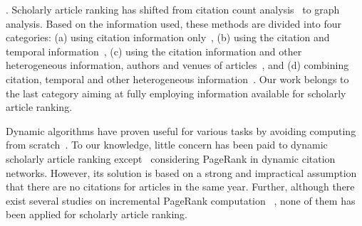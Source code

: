 . %
%
%
Scholarly article ranking has shifted from citation count analysis~\cite{Garfield471,Hirsch15112005} to graph analysis\cite{ChenXMR07,Zhou07-CoRank,Jiang12-MRank,Liang16AAAI,Li08TSRanking,Wang13AAAI,WalkerXKM07,sayyadi09,
Wang16TIST,Ng11KDD}.
Based on the information used, these methods are divided into four categories: (a) using citation information only~\cite{Garfield471,Hirsch15112005,ChenXMR07,Ng11KDD}, (b) using the citation and temporal information~\cite{Li08TSRanking,WalkerXKM07}, (c) using the citation information and other heterogeneous information, \eg authors and venues of articles~\cite{Zhou07-CoRank,Jiang12-MRank,Liang16AAAI}, and (d) combining citation, temporal and other heterogeneous information~\cite{sayyadi09,Wang16TIST,Wang13AAAI}.
Our work belongs to the last category aiming at fully employing information available for scholarly article ranking.







Dynamic algorithms have proven useful for various tasks by avoiding computing from scratch~\cite{RamalingamR93}.
To our knowledge, little concern has been paid to dynamic scholarly article ranking except~\cite{GhoshKHLL11} considering PageRank in dynamic citation networks. However, its solution is based on a strong and impractical assumption that there are no citations for articles in the same year.
Further, although there exist several studies on incremental PageRank computation~\cite{DesikanPSK05,AbiteboulPC03,WuR09} , none of them has been applied for scholarly article ranking.

